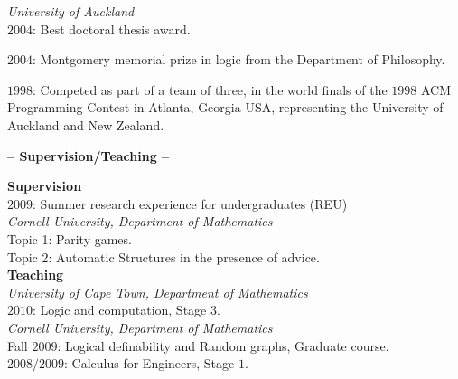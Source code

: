 \documentclass[a4paper]{article}
\def\tit#1{\medskip \begin{center}  {\Large {\bf -- #1 -- }} \end{center}}
\begin{document}
{\em University of Auckland}\\
$2004$: Best doctoral thesis award.

$2004$: Montgomery memorial prize in logic from the Department of Philosophy.



%

\iffalse

$1998$ and $1999$: Summer Scholarships from the Mathematics Department
 for vacational study and research.\\
\fi


$1998$: Competed as part of a team of three, in the world finals of the $1998$
ACM Programming Contest in Atlanta, Georgia USA, representing the University of Auckland
and New Zealand. 

\tit{Supervision/Teaching}

{\bf Supervision}\\
$2009$: Summer research experience for undergraduates (REU)\\
{\em  Cornell University, Department of Mathematics}\\
Topic 1: Parity games.\\
Topic 2: Automatic Structures in the presence of advice.\\

 {\bf Teaching}\\
{\it University of Cape Town, Department of Mathematics}\\
$2010$: Logic and computation, Stage $3$.\\

 {\it Cornell University, Department of Mathematics}\\
 Fall $2009$: Logical definability and Random graphs, Graduate course.\\ 
 $2008/2009$: Calculus for Engineers, Stage $1$.\\
\end{document}
